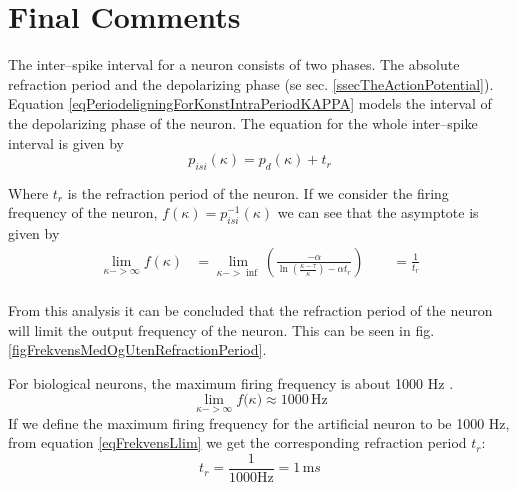 



\section{Final Comments}
\label{ssecValueOfAlpha}

The inter--spike interval for a neuron consists of two phases. 
The absolute refraction period and the depolarizing phase (se sec. \ref{ssecTheActionPotential}).
Equation \eqref{eqPeriodeligningForKonstIntraPeriodKAPPA} models the interval of the depolarizing phase of the neuron. %
The equation for the whole inter--spike interval is given by
\begin{equation}
	p_{isi}(\kappa) = p_d(\kappa) + t_r
	\label{eqHeilePerioden}
\end{equation}

Where $t_r$ is the refraction period of the neuron. %
If we consider the firing frequency of the neuron, $f(\kappa) = p_{isi}^{-1}(\kappa)$ we can see that the asymptote is given by
\begin{equation}
	\begin{split}
		\lim_{\kappa->\infty}{ f(\kappa)} &= \lim_{\kappa->\inf}\left( \frac{-\alpha}{\ln \left( \frac{\kappa - \tau}{\kappa} \right) - \alpha t_r} \right)   \qquad = \frac{1}{t_r} \\ 
	\end{split}
	\label{eqFrekvensLlim} 
\end{equation}

From this analysis it can be concluded that the refraction period of the neuron will limit the output frequency of the neuron.
This can be seen in fig. \ref{figFrekvensMedOgUtenRefractionPeriod}.

For biological neurons, the maximum firing frequency is about 1000 Hz \cite{NeuroscienceExploringTheBrain3edKAP4}. %
\begin{equation}
	\lim_{\kappa->\infty}{ f(\kappa}) \approx 1000 \, \text{Hz}
\end{equation}
If we define the maximum firing frequency for the artificial neuron to be 1000 Hz, from equation \ref{eqFrekvensLlim} we get the corresponding refraction period $t_r$:
\begin{equation}
	t_r = \frac{1}{1000 \text{Hz}} = 1 \, \text{m}s %
\end{equation}


